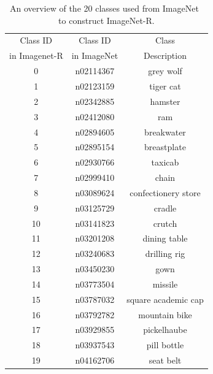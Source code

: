 \documentclass[letterpaper,twocolumn,10pt]{article}
\begin{document}
\begin{appendices}
\begin{table}[t]
\caption{An overview of the 20 classes used from ImageNet~\cite{deng2009imagenet} to construct ImageNet-R.}
\label{tab:imagenetr}
\centering
\begin{tabular}{c c c}
\toprule
 Class ID & Class ID & Class \\
 in Imagenet-R & in ImageNet & Description \\
\midrule
0 & n02114367 & grey wolf\\
1 & n02123159 & tiger cat\\
2 & n02342885 & hamster\\
3 & n02412080 & ram\\
4 & n02894605 & breakwater\\
5 & n02895154 & breastplate\\
6 & n02930766 & taxicab\\
7 & n02999410 & chain\\
8 & n03089624 & confectionery store\\
9 & n03125729 & cradle\\
10 & n03141823 & crutch\\
11 & n03201208 & dining table\\
12 & n03240683 & drilling rig\\
13 & n03450230 & gown\\
14 & n03773504 & missile\\
15 & n03787032 & square academic cap\\
16 & n03792782 & mountain bike\\
17 & n03929855 & pickelhaube\\
18 & n03937543 & pill bottle\\
19 & n04162706 & seat belt\\
\bottomrule
\end{tabular}
\end{table}

\end{appendices}
\end{document}
